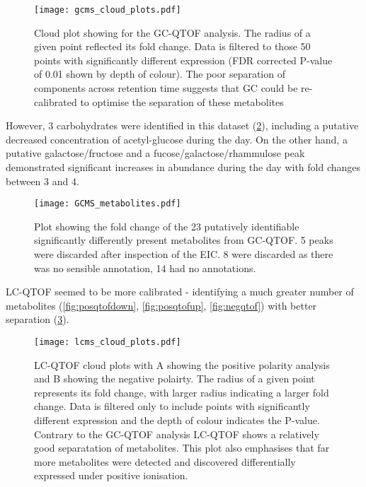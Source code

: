 \begin{figure}
    \centering
    \texttt{[image: gcms\_cloud\_plots.pdf]}
    \caption[GC-QTOF cloud plot]{Cloud plot showing for the GC-QTOF analysis. 
    The radius of a given point reflected its fold change.
    Data is filtered to those 50 points with significantly 
different expression (FDR corrected P-value of 0.01 shown by 
depth of colour).  The poor separation of components across
retention time suggests that GC could be re-calibrated to optimise
the separation of these metabolites}
    \label{fig:gcms_clouds}
\end{figure}

However, 3 carbohydrates were identified in this dataset (\cref{fig:gcms_metabolites}), including 
a putative decreased concentration of acetyl-glucose during the day.
On the other hand, a putative galactose/fructose and a fucose/galactose/rhammulose
peak demonstrated significant increases in abundance during the day with fold changes
between 3 and 4.

\begin{figure}
    \centering
    \texttt{[image: GCMS\_metabolites.pdf]}
    \caption[Plot of identifiable GC-QTOF metabolites]{Plot showing the
        fold change of the 23 putatively identifiable significantly
        differently present metabolites from GC-QTOF. 5 peaks
        were discarded after inspection of the EIC. 8 were discarded
    as there was no sensible annotation, 14 had no annotations.}
    \label{fig:gcms_metabolites}
\end{figure}

LC-QTOF seemed to be more calibrated - identifying a much greater number of metabolites
(\cref{fig:posqtofdown}, \cref{fig:posqtofup}, \cref{fig:negqtof})
with better separation (\cref{fig:lcms_clouds}).

\begin{figure}
    \centering
    \texttt{[image: lcms\_cloud\_plots.pdf]}
    \caption[LC-QTOF cloud plots]{LC-QTOF cloud plots with A showing
        the positive polarity analysis and B showing the negative polairty. 
        The radius
        of a given point represents its fold change, with larger
        radius indicating a larger fold change.   Data is filtered 
        only to include points with significantly different expression
        and the depth of colour indicates the P-value.   Contrary to
        the GC-QTOF analysis LC-QTOF shows a relatively good
        separatation of metabolites.  This plot also
    emphasises that far more metabolites were detected and discovered
differentially expressed under positive ionisation.}
    \label{fig:lcms_clouds}
\end{figure}



